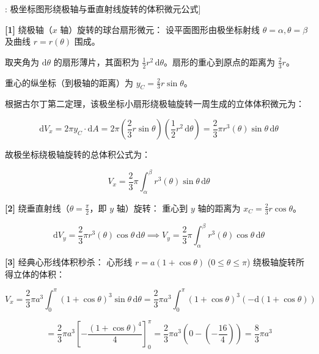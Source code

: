 \documentclass[11pt,a4paper,UTF8]{ctexart}
\begin{document}
\begin{thmbox}[模型[5]: 极坐标图形绕极轴与垂直射线旋转的体积微元公式]

\textbf{[1]} 绕极轴（$x$ 轴）旋转的球台扇形微元：
设平面图形由极坐标射线 $\theta = \alpha, \theta = \beta$ 及曲线 $r = r(\theta)$ 围成。

取夹角为 $\mathrm{d}\theta$ 的扇形薄片，其面积为 $\frac{1}{2}r^2\,\mathrm{d}\theta$。扇形的重心到原点的距离为 $\frac{2}{3}r$。

重心的纵坐标（到极轴的距离）为 $y_C = \frac{2}{3}r\sin\theta$。

根据古尔丁第二定理，该极坐标小扇形绕极轴旋转一周生成的立体体积微元为：


\begin{equation*}
\mathrm{d}V_x = 2\pi y_C \cdot \mathrm{d}A = 2\pi \left(\frac{2}{3}r\sin\theta\right) \left(\frac{1}{2}r^2\,\mathrm{d}\theta\right) = \frac{2}{3}\pi r^3(\theta)\sin\theta\,\mathrm{d}\theta
\end{equation*}


故极坐标绕极轴旋转的总体积公式为：


\begin{equation*}
V_x = \frac{2}{3}\pi \int_\alpha^\beta r^3(\theta)\sin\theta\,\mathrm{d}\theta
\end{equation*}


\textbf{[2]} 绕垂直射线（$\theta = \frac{\pi}{2}$，即 $y$ 轴）旋转：
重心到 $y$ 轴的距离为 $x_C = \frac{2}{3}r\cos\theta$。


\begin{equation*}
\mathrm{d}V_y = \frac{2}{3}\pi r^3(\theta)\cos\theta\,\mathrm{d}\theta \implies V_y = \frac{2}{3}\pi \int_\alpha^\beta r^3(\theta)\cos\theta\,\mathrm{d}\theta
\end{equation*}


\textbf{[3]} 经典心形线体积秒杀：
心形线 $r = a(1+\cos\theta)$ ($0 \leqslant \theta \leqslant \pi$) 绕极轴旋转所得立体的体积：


\begin{equation*}
V_x = \frac{2}{3}\pi a^3 \int_0^\pi (1+\cos\theta)^3 \sin\theta\,\mathrm{d}\theta = \frac{2}{3}\pi a^3 \int_0^\pi (1+\cos\theta)^3 (-\mathrm{d}(1+\cos\theta))
\end{equation*}



\begin{equation*}
= \frac{2}{3}\pi a^3 \left[-\frac{(1+\cos\theta)^4}{4}\right]_0^\pi = \frac{2}{3}\pi a^3 \left(0 - \left(-\frac{16}{4}\right)\right) = \frac{8}{3}\pi a^3
\end{equation*}


\end{thmbox}
\end{document}
